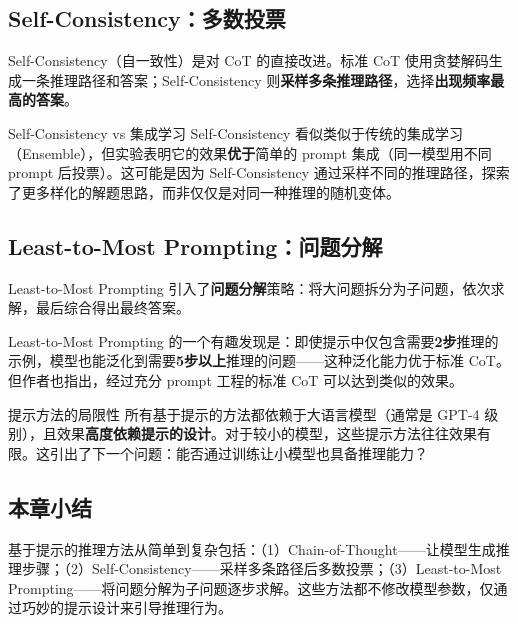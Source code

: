 \documentclass[a4paper]{article}
\begin{document}
\subsection{Self-Consistency：多数投票}

Self-Consistency（自一致性）是对 CoT 的直接改进。标准 CoT 使用贪婪解码生成一条推理路径和答案；Self-Consistency 则\textbf{采样多条推理路径}，选择\textbf{出现频率最高的答案}。




\begin{knowledgebox}{Self-Consistency vs 集成学习}
Self-Consistency 看似类似于传统的集成学习（Ensemble），但实验表明它的效果\textbf{优于}简单的 prompt 集成（同一模型用不同 prompt 后投票）。这可能是因为 Self-Consistency 通过采样不同的推理路径，探索了更多样化的解题思路，而非仅仅是对同一种推理的随机变体。
\end{knowledgebox}

\subsection{Least-to-Most Prompting：问题分解}

Least-to-Most Prompting 引入了\textbf{问题分解}策略：将大问题拆分为子问题，依次求解，最后综合得出最终答案。




Least-to-Most Prompting 的一个有趣发现是：即使提示中仅包含需要\textbf{2步}推理的示例，模型也能泛化到需要\textbf{5步以上}推理的问题——这种泛化能力优于标准 CoT。但作者也指出，经过充分 prompt 工程的标准 CoT 可以达到类似的效果。

\begin{warningbox}{提示方法的局限性}
所有基于提示的方法都依赖于大语言模型（通常是 GPT-4 级别），且效果\textbf{高度依赖提示的设计}。对于较小的模型，这些提示方法往往效果有限。这引出了下一个问题：能否通过训练让小模型也具备推理能力？
\end{warningbox}

\subsection{本章小结}

基于提示的推理方法从简单到复杂包括：（1）Chain-of-Thought——让模型生成推理步骤；（2）Self-Consistency——采样多条路径后多数投票；（3）Least-to-Most Prompting——将问题分解为子问题逐步求解。这些方法都不修改模型参数，仅通过巧妙的提示设计来引导推理行为。
\end{document}
